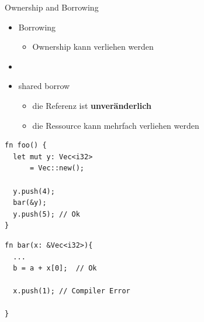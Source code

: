 \documentclass{beamer}
\begin{document}
\begin{frame}[fragile]{Ownership and Borrowing}
	\begin{itemize}
	    \item Borrowing
	    \begin{itemize}
	        \item Ownership kann verliehen werden
	    \end{itemize}
	    \item[]
	    \pause
	    \item shared borrow  
	    \begin{itemize}
	      \item die Referenz ist \textbf{unveränderlich}
	      \item die Ressource kann mehrfach verliehen werden
	      \pause
	    \end{itemize}
	\end{itemize}
\begin{center}
\hspace{3pt}
\begin{minipage}[t]{.47\textwidth}
\begin{lstlisting}
fn foo() {	
  let mut y: Vec<i32> 
      = Vec::new();
		
  y.push(4);	
  bar(&y);	
  y.push(5); // Ok
}
\end{lstlisting}				
\end{minipage}
\hspace{3pt}
\begin{minipage}[t]{.47\textwidth}
\begin{lstlisting}
fn bar(x: &Vec<i32>){
  ...	
  b = a + x[0];  // Ok	
	
  x.push(1); // Compiler Error
	
}
\end{lstlisting}				
\end{minipage}
\end{center}
\end{frame}
\end{document}
